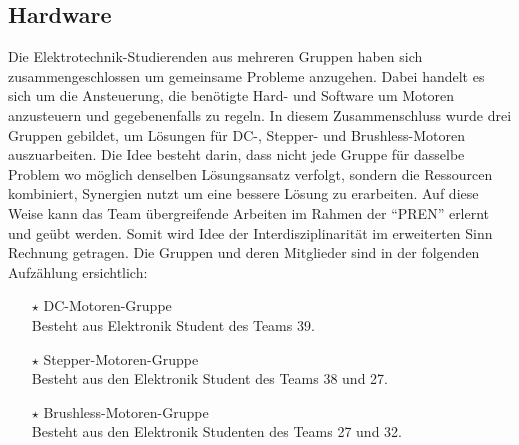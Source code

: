 \subsection{Hardware}
    Die Elektrotechnik-Studierenden aus mehreren Gruppen haben sich zusammengeschlossen um gemeinsame Probleme anzugehen. Dabei handelt es sich um die Ansteuerung, die benötigte Hard- und Software um Motoren anzusteuern und gegebenenfalls zu regeln. In diesem Zusammenschluss wurde drei Gruppen gebildet, um Lösungen für DC-, Stepper- und Brushless-Motoren auszuarbeiten. Die Idee besteht darin, dass nicht jede Gruppe für dasselbe Problem wo möglich denselben Lösungsansatz verfolgt, sondern die Ressourcen kombiniert, Synergien nutzt um eine bessere Lösung zu erarbeiten. Auf diese Weise kann das Team übergreifende Arbeiten im Rahmen der \enquote{PREN} erlernt und geübt werden. Somit wird Idee der Interdisziplinarität im erweiterten Sinn Rechnung getragen. Die Gruppen und deren Mitglieder sind in der folgenden Aufzählung ersichtlich:
    \begin{itemize}
        \item[$\star$] DC-Motoren-Gruppe\\
            Besteht aus Elektronik Student des Teams 39.
        \item[$\star$] Stepper-Motoren-Gruppe\\
            Besteht aus den Elektronik Student des Teams 38 und 27.
        \item[$\star$] Brushless-Motoren-Gruppe\\
            Besteht aus den Elektronik Studenten des Teams 27 und 32.
    \end{itemize}